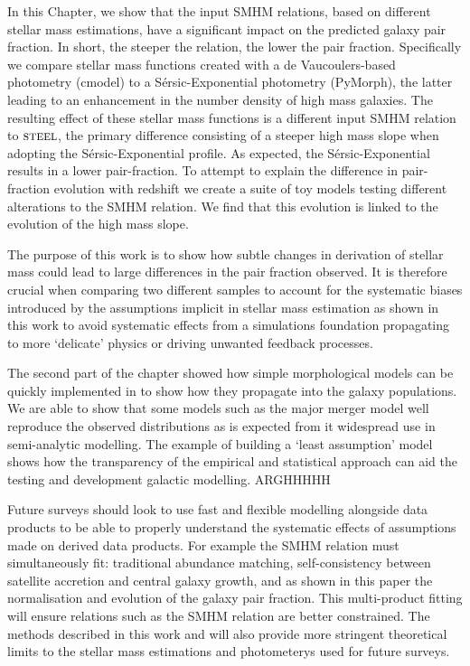 In this Chapter, we show that the input SMHM relations, based on different stellar mass estimations, have a significant impact on the predicted galaxy pair fraction. In short, the steeper the relation, the lower the pair fraction. Specifically we compare stellar mass functions created with a de Vaucoulers-based photometry (cmodel) to a S\'ersic-Exponential photometry (PyMorph), the latter leading to an enhancement in the number density of high mass galaxies. The resulting effect of these stellar mass functions is a different input SMHM relation to $\textsc{steel}$, the primary difference consisting of a steeper high mass slope when adopting the S\'ersic-Exponential profile. As expected, the S\'ersic-Exponential results in a lower pair-fraction. To attempt to explain the difference in pair-fraction evolution with redshift we create a suite of toy models testing different alterations to the SMHM relation. We find that this evolution is linked to the evolution of the high mass slope.

The purpose of this work is to show how subtle changes in derivation of stellar mass could lead to large differences in the pair fraction observed. It is therefore crucial when comparing two different samples to account for the systematic biases introduced by the assumptions implicit in stellar mass estimation as shown in this work to avoid systematic effects from a simulations foundation propagating to more `delicate' physics or driving unwanted feedback processes.

The second part of the chapter showed how simple morphological models can be quickly implemented in \steel to show how they propagate into the galaxy populations. We are able to show that some models such as the major merger model well reproduce the observed distributions as is expected from it widespread use in semi-analytic modelling. The example of building a `least assumption' model shows how the transparency of the empirical and statistical approach can aid the testing and development galactic modelling. ARGHHHHH

Future surveys should look to use fast and flexible modelling alongside data products to be able to properly understand the systematic effects of assumptions made on derived data products. For example the SMHM relation must simultaneously fit: traditional abundance matching, self-consistency between satellite accretion and central galaxy growth, and as shown in this paper the normalisation and evolution of the galaxy pair fraction. This multi-product fitting will ensure relations such as the SMHM relation are better constrained. The methods described in this work and  will also provide more stringent theoretical limits to the stellar mass estimations and photometerys used for future surveys.

